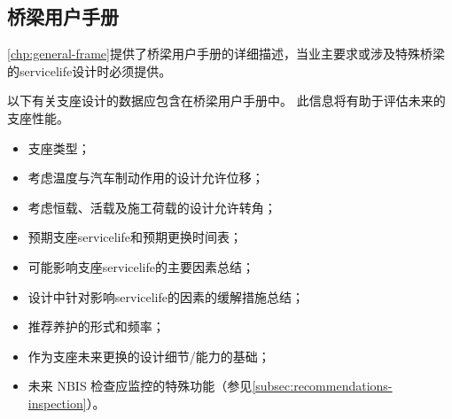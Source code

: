 \subsection{桥梁用户手册}
\cref{chp:general-frame}提供了桥梁用户手册的详细描述，当业主要求或涉及特殊桥梁的\gls{servicelife}设计时必须提供。

以下有关支座设计的数据应包含在桥梁用户手册中。 此信息将有助于评估未来的支座性能。
\begin{itemize}
  \item 支座类型；
  \item 考虑温度与汽车制动作用的设计允许位移；
  \item 考虑恒载、活载及施工荷载的设计允许转角；
  \item 预期支座\gls*{servicelife}和预期更换时间表；
  \item 可能影响支座\gls*{servicelife}的主要因素总结；
  \item 设计中针对影响\gls*{servicelife}的因素的缓解措施总结；
  \item 推荐养护的形式和频率；
  \item 作为支座未来更换的设计细节/能力的基础；
  \item 未来 NBIS 检查应监控的特殊功能（参见\cref{subsec:recommendations-inspection}）。
\end{itemize}

